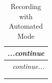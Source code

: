 \begin{longtable}{|p{3.5cm}|p{11.5cm}|}
    
    \hline
    \endfirsthead
    
    \hline
    \multicolumn{2}{|l|}{\textit{...continue}} \\ \hline
    \endhead
    
    \hline
    \multicolumn{2}{|r|}{\textit{continue...}} \\ \hline
    \endfoot
    
    \caption{Recording with Automated Mode} \\
    \hline
    \endlastfoot

    

\end{longtable}
